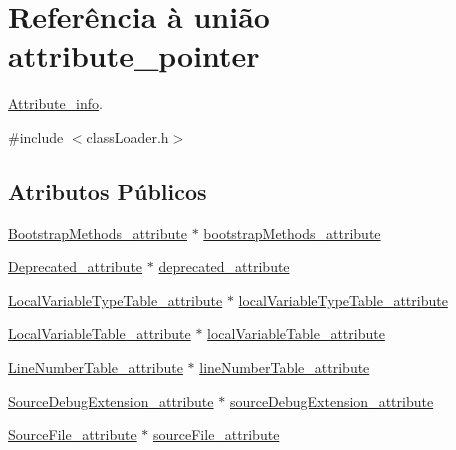 \hypertarget{unionattribute__pointer}{}\section{Referência à união attribute\+\_\+pointer}
\label{unionattribute__pointer}


\hyperlink{struct_attribute__info}{Attribute\+\_\+info}.  




{\ttfamily \#include $<$class\+Loader.\+h$>$}

\subsection*{Atributos Públicos}
\begin{DoxyCompactItemize}
\item 
\hyperlink{struct_bootstrap_methods__attribute}{Bootstrap\+Methods\+\_\+attribute} $\ast$ \hyperlink{unionattribute__pointer_a8c5dd68e9d26cf4693af6d45ca90e1bf}{bootstrap\+Methods\+\_\+attribute}
\item 
\hyperlink{struct_deprecated__attribute}{Deprecated\+\_\+attribute} $\ast$ \hyperlink{unionattribute__pointer_af759696767b027a44ffbeafbf37f6de6}{deprecated\+\_\+attribute}
\item 
\hyperlink{struct_local_variable_type_table__attribute}{Local\+Variable\+Type\+Table\+\_\+attribute} $\ast$ \hyperlink{unionattribute__pointer_aa4cb0de3753d905a41d7b4c8acb32b6b}{local\+Variable\+Type\+Table\+\_\+attribute}
\item 
\hyperlink{struct_local_variable_table__attribute}{Local\+Variable\+Table\+\_\+attribute} $\ast$ \hyperlink{unionattribute__pointer_a80c50f643d3d69ccee07e33445d8622a}{local\+Variable\+Table\+\_\+attribute}
\item 
\hyperlink{struct_line_number_table__attribute}{Line\+Number\+Table\+\_\+attribute} $\ast$ \hyperlink{unionattribute__pointer_aa8a3d8595ef1ec23cd58404b007970db}{line\+Number\+Table\+\_\+attribute}
\item 
\hyperlink{struct_source_debug_extension__attribute}{Source\+Debug\+Extension\+\_\+attribute} $\ast$ \hyperlink{unionattribute__pointer_a7376f6951c39fcde10a0b233e20e00e0}{source\+Debug\+Extension\+\_\+attribute}
\item 
\hyperlink{struct_source_file__attribute}{Source\+File\+\_\+attribute} $\ast$ \hyperlink{unionattribute__pointer_a709f793cbbe1f5058a168d970211292a}{source\+File\+\_\+attribute}
\item 

\end{DoxyCompactItemize}
